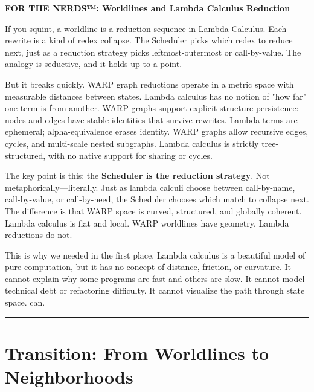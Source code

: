 \begin{mdframed}[linewidth=1pt, linecolor=black!50, innertopmargin=8pt, innerbottommargin=8pt]
\noindent\textbf{FOR THE NERDS™: Worldlines and Lambda Calculus Reduction}

\medskip

If you squint, a worldline is a reduction sequence in Lambda Calculus. Each rewrite is a kind of
redex collapse. The Scheduler picks which redex to reduce next, just as a reduction strategy picks
leftmost-outermost or call-by-value. The analogy is seductive, and it holds up to a point.

But it breaks quickly. WARP graph reductions operate in a metric space with measurable distances
between states. Lambda calculus has no notion of "how far" one term is from another. WARP graphs
support explicit structure persistence: nodes and edges have stable identities that survive rewrites.
Lambda terms are ephemeral; alpha-equivalence erases identity. WARP graphs allow recursive edges,
cycles, and multi-scale nested subgraphs. Lambda calculus is strictly tree-structured, with no native
support for sharing or cycles.

The key point is this: the \textbf{Scheduler is the reduction strategy}. Not metaphorically—literally.
Just as lambda calculi choose between call-by-name, call-by-value, or call-by-need, the Scheduler
chooses which match to collapse next. The difference is that WARP space is curved, structured, and
globally coherent. Lambda calculus is flat and local. WARP worldlines have geometry. Lambda reductions
do not.

This is why we needed \COMPUTER{} in the first place. Lambda calculus is a beautiful model of
pure computation, but it has no concept of distance, friction, or curvature. It cannot explain why
some programs are fast and others are slow. It cannot model technical debt or refactoring difficulty.
It cannot visualize the path through state space. \COMPUTER{} can.

\end{mdframed}

\begin{center}
\rule{0.5\linewidth}{0.5pt}
\end{center}

\section{Transition: From Worldlines to Neighborhoods}
\label{6.8-transition}

